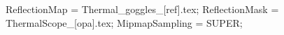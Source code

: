 ReflectionMap = Thermal_goggles_[ref].tex;
ReflectionMask = ThermalScope_[opa].tex;
MipmapSampling = SUPER;
